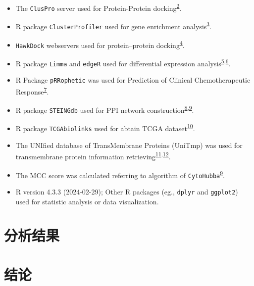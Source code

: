 \documentclass[
]{article}
\providecommand{\tightlist}{%
  \setlength{\itemsep}{0pt}\setlength{\parskip}{0pt}}
\begin{document}
\begin{itemize}
\tightlist
\item
  The \texttt{ClusPro} server used for Protein-Protein docking\textsuperscript{\protect\hyperlink{ref-TheClusproWebKozako2017}{2}}.
\item
  R package \texttt{ClusterProfiler} used for gene enrichment analysis\textsuperscript{\protect\hyperlink{ref-ClusterprofilerWuTi2021}{3}}.
\item
  \texttt{HawkDock} webservers used for protein--protein docking\textsuperscript{\protect\hyperlink{ref-HawkdockAWebWeng2019}{4}}.
\item
  R package \texttt{Limma} and \texttt{edgeR} used for differential expression analysis\textsuperscript{\protect\hyperlink{ref-LimmaPowersDiRitchi2015}{5},\protect\hyperlink{ref-EdgerDifferenChen}{6}}.
\item
  R Package \texttt{pRRophetic} was used for Prediction of Clinical Chemotherapeutic Response\textsuperscript{\protect\hyperlink{ref-PrropheticAnGeeleh2014}{7}}.
\item
  R package \texttt{STEINGdb} used for PPI network construction\textsuperscript{\protect\hyperlink{ref-TheStringDataSzklar2021}{8},\protect\hyperlink{ref-CytohubbaIdenChin2014}{9}}.
\item
  R package \texttt{TCGAbiolinks} used for abtain TCGA dataset\textsuperscript{\protect\hyperlink{ref-TcgabiolinksAColapr2015}{10}}.
\item
  The UNIfied database of TransMembrane Proteins (UniTmp) was used for transmembrane protein information retrieving\textsuperscript{\protect\hyperlink{ref-UnitmpUnifiedDobson2024}{11},\protect\hyperlink{ref-TheHumanTransDobson2015}{12}}.
\item
  The MCC score was calculated referring to algorithm of \texttt{CytoHubba}\textsuperscript{\protect\hyperlink{ref-CytohubbaIdenChin2014}{9}}.
\item
  R version 4.3.3 (2024-02-29); Other R packages (eg., \texttt{dplyr} and \texttt{ggplot2}) used for statistic analysis or data visualization.
\end{itemize}

\hypertarget{results}{%
\section{分析结果}\label{results}}

\hypertarget{dis}{%
\section{结论}\label{dis}}
\end{document}
